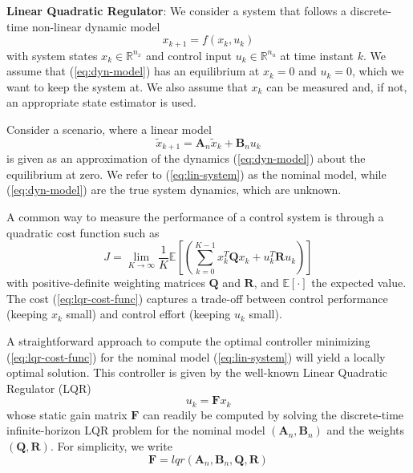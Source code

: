 \textbf{Linear Quadratic Regulator}: We consider a system that follows a discrete-time non-linear dynamic model
\begin{equation}
	\label{eq:dyn-model}
	x_{k+1} = f(x_k, u_k)
\end{equation}
with system states $x_k \in \mathbb{R}^{n_x}$ and control input $u_k \in \mathbb{R}^{n_u}$ at time instant $k$. We assume that (\ref{eq:dyn-model}) has an equilibrium at $x_k=0$ and $u_k=0$, which we want to keep the system at. We also assume that $x_k$ can be measured and, if not, an appropriate state estimator is used.

Consider a scenario, where a linear model
\begin{equation}
\label{eq:lin-system}
\tilde{x}_{k+1} = \boldsymbol{A}_n \tilde{x}_k + \boldsymbol{B}_n u_k
\end{equation}
is given as an approximation of the dynamics (\ref{eq:dyn-model}) about the equilibrium at zero. We refer to (\ref{eq:lin-system}) as the nominal model, while (\ref{eq:dyn-model}) are the true system dynamics, which are unknown.

A common way to measure the performance of a control system is through a quadratic cost function such as
\begin{equation}
\label{eq:lqr-cost-func}
J=\lim_{K \rightarrow \infty}\frac{1}{K}\mathbb{E}\left[\left(\sum_{k=0}^{K-1}x_k^{T}\boldsymbol{Q}x_k + u_k^{T}\boldsymbol{R}u_k\right)\right]
\end{equation}
with positive-definite weighting matrices $\boldsymbol{Q}$ and $\boldsymbol{R}$, and $\mathbb{E}[\cdot]$ the expected value. The cost (\ref{eq:lqr-cost-func}) captures a trade-off between control performance (keeping $x_k$ small) and control effort (keeping $u_k$ small).

A straightforward approach to compute the optimal controller minimizing (\ref{eq:lqr-cost-func}) for the nominal model (\ref{eq:lin-system}) will yield a locally optimal solution. This controller is given by the well-known Linear Quadratic Regulator (LQR) 
\begin{equation}
u_k = \boldsymbol{F}x_k
\end{equation}
whose static gain matrix $\boldsymbol{F}$ can readily be computed by solving the discrete-time infinite-horizon LQR problem for the nominal model $(\boldsymbol{A}_n, \boldsymbol{B}_n)$ and the weights $(\boldsymbol{Q}, \boldsymbol{R})$. For simplicity, we write
\begin{equation}
\label{eq:lqr}
\boldsymbol{F} = lqr(\boldsymbol{A}_n, \boldsymbol{B}_n, \boldsymbol{Q}, \boldsymbol{R})
\end{equation}

